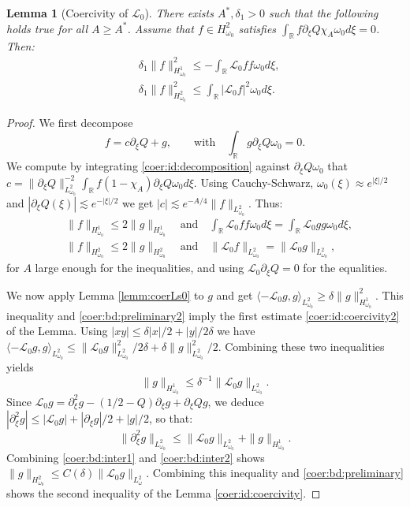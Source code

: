 \documentclass[11pt]{aims}
\newtheorem{lemma}[theorem]{Lemma}
\theoremstyle{definition}
\newcommand{\Ls}{\mathscr{L}}
\newcommand{\pa}{\partial}
\newcommand{\be}{\begin{equation}}
\newcommand{\ee}{\end{equation}}
\numberwithin{equation}{section}
\begin{document}
\begin{lemma}[Coercivity of $\Ls_0$] \label{lemm:coerL02} There exists $A^*,\delta_1>0$ such that the following holds true for all $A\geq A^*$. Assume that $f\in H^2_{\omega_0}$ satisfies $\int_{\mathbb R} f \pa_\xi Q \chi_A \omega_0 d\xi = 0$. Then:
\begin{align}
 \label{coer:id:coercivity2}
& \delta_1  \| f\|^2_{H^1_{\omega_0}} \leq - \int_{\mathbb R} \Ls_0 f f \omega_0 d\xi, \\
 \label{coer:id:coercivity}
& \delta_1  \| f\|^2_{H^2_{\omega_0}} \leq \int_{\mathbb R} |\Ls_0 f|^2 \omega_0 d\xi.
\end{align}
\end{lemma}

\begin{proof} We first decompose
\be
\label{coer:id:decomposition}
f=c\pa_\xi Q+g, \qquad \mbox{with}\quad \int_{\mathbb R} g \pa_\xi Q \omega_0=0.
\ee
We compute by integrating \eqref{coer:id:decomposition} against $\pa_\xi Q\omega_0$ that $c=\| \pa_\xi Q\|_{L^2_{\omega_0}}^{-2}\int_{\mathbb R} f(1-\chi_A)\pa_\xi Q\omega_0d\xi$. Using Cauchy-Schwarz, $\omega_0(\xi)\approx e^{|\xi|/2}$ and $|\pa_\xi Q(\xi)|\lesssim e^{-|\xi|/2}$ we get $|c|\lesssim e^{-A/4}\| f\|_{L^2_{\omega_0}}$. Thus:
\begin{align}
\label{coer:bd:preliminary2}
& \| f\|_{H^1_{\omega_0}}\leq 2 \| g\|_{H^1_{\omega_0}} \quad \mbox{and} \quad \int_{\mathbb R} \mathcal L_0 f f \omega_0 d\xi=  \int_{\mathbb R} \mathcal L_0 gg \omega_0d\xi,\\
\label{coer:bd:preliminary}
& \| f\|_{H^2_{\omega_0}}\leq 2 \| g\|_{H^2_{\omega_0}} \quad \mbox{and} \quad \| \mathcal L_0 f\|_{L^2_{\omega_0}} = \| \mathcal L_0 g\|_{L^2_{\omega_0}} ,
\end{align}
 for $A$ large enough for the inequalities, and using $\mathcal L_0\pa_\xi Q=0$ for the equalities.
 
 We now apply Lemma \ref{lemm:coerLs0} to $g$ and get $\langle -\mathcal L_0 g, g\rangle_{L^2_{\omega_0}}\geq \delta \| g \|_{H^1_{\omega_0}}^2$. This inequality and \eqref{coer:bd:preliminary2} imply the first estimate \eqref{coer:id:coercivity2} of the Lemma. Using $|xy|\leq \delta |x|/2+|y|/2\delta$ we have $\langle -\mathcal L_0 g, g\rangle_{L^2_{\omega_0}}\leq \| \mathcal L_0 g \|_{L^2_{\omega_0}}^2/2\delta+\delta \| g\|_{L^2_{\omega_0}}^2/2$. Combining these two inequalities yields
\be
\label{coer:bd:inter1}
\| g\|_{H^1_{\omega_0}}\leq \delta^{-1} \| \mathcal L_0 g\|_{L^2_{\omega_0}}.
\ee
Since $\mathcal L_0g=\pa_\xi^2 g-(1/2-Q)\pa_\xi g+\pa_\xi Q g$, we deduce $|\pa_\xi^2 g|\leq |\mathcal L_0 g|+|\pa_\xi g|/2+|g|/2$, so that:
\be
\label{coer:bd:inter2}
\| \pa_\xi^2 g\|_{L^2_{\omega_0}}\leq \| \mathcal L_0 g\|_{L^2_{\omega_0}}+\| g\|_{H^1_{\omega_0}}.
\ee
Combining \eqref{coer:bd:inter1} and \eqref{coer:bd:inter2} shows $\| g\|_{H^2_{\omega_0}}\leq C(\delta)\| \mathcal L_0 g\|_{L^2_\omega}$. Combining this inequality and \eqref{coer:bd:preliminary} shows the second inequality of the Lemma \eqref{coer:id:coercivity}.\end{proof}
\end{document}
